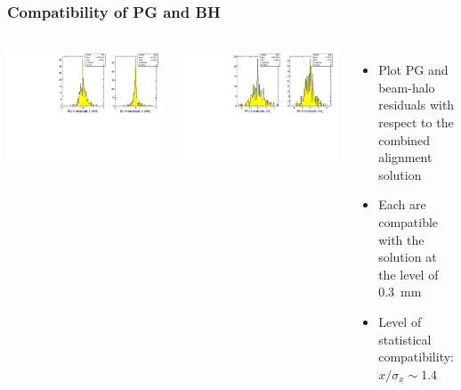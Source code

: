\documentclass[compress]{beamer}
\begin{document}
\begin{frame}
\frametitle{Compatibility of PG and BH}

\begin{columns}
\includegraphics[width=\linewidth]{allplots_fit_residuals.pdf}

\vspace{0.5 cm}
\includegraphics[width=\linewidth]{allplots_fit_residualsNorm.pdf}

\begin{itemize}
\item Plot PG and beam-halo residuals with respect to the combined alignment solution

\item Each are compatible with the solution at the level of 0.3~mm

\item Level of statistical compatibility: $x/\sigma_x \sim 1.4$
\end{itemize}
\end{columns}
\end{frame}
\end{document}
